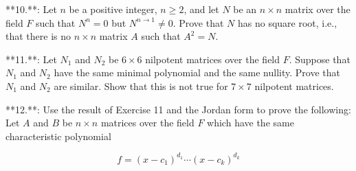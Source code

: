 **10.**: Let \(n\) be a positive integer, \(n\geq 2\), and let \(N\) be an \(n\times n\) matrix over the field \(F\) such that \(N^{n}=0\) but \(N^{n\to 1}\neq 0\). Prove that \(N\) has no square root, i.e., that there is no \(n\times n\) matrix \(A\) such that \(A^{2}=N\).

**11.**: Let \(N_{1}\) and \(N_{2}\) be \(6\times 6\) nilpotent matrices over the field \(F\). Suppose that \(N_{1}\) and \(N_{2}\) have the same minimal polynomial and the same nullity. Prove that \(N_{1}\) and \(N_{2}\) are similar. Show that this is not true for \(7\times 7\) nilpotent matrices.

**12.**: Use the result of Exercise 11 and the Jordan form to prove the following: Let \(A\) and \(B\) be \(n\times n\) matrices over the field \(F\) which have the same characteristic polynomial

\[f=(x-c_{1})^{d_{1}}\cdots(x-c_{k})^{d_{k}}\] 